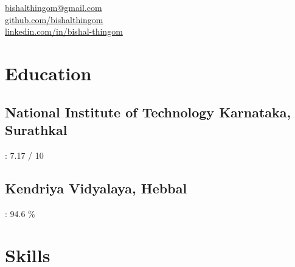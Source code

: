 \documentclass[]{hieudo-build}
\begin{document}
%
%
{
	\faEnvelope \href{mailto:bishalthingom@gmail.com}{ bishalthingom@gmail.com}\\
	\faGithub \href{https://github.com/bishalthingom}{   github.com/bishalthingom}\\
	\faLinkedinSquare \href{https://www.linkedin.com/in/bishal-thingom/}{   linkedin.com/in/bishal-thingom}
}


    
%
%
\begin{minipage}[t]{0.34\textwidth} 

\section{Education} 

\subsection{National Institute of Technology \break Karnataka, Surathkal}
: 7.17 / 10
\sectionsep

\subsection{Kendriya Vidyalaya, Hebbal}
: 94.6 \%
\sectionsep

\section{Skills}
\vspace{2mm}
\vspace{2mm}
\vspace{2mm}



\end{minipage}
\end{document}
